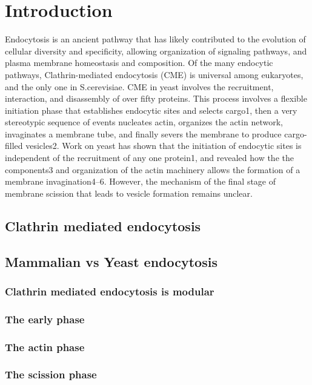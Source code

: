 \chapter{Introduction} %

\label{Ch:Aims} %

Endocytosis is an ancient pathway that has likely contributed to the evolution of cellular diversity and specificity, allowing organization of signaling pathways, and plasma membrane homeostasis and composition. Of the many endocytic pathways, Clathrin-mediated endocytosis (CME) is universal among eukaryotes, and the only one in S.cerevisiae. CME in yeast involves the recruitment, interaction, and disassembly of over fifty proteins. This process involves a flexible initiation phase that establishes endocytic sites and selects cargo1, then a very stereotypic sequence of events nucleates actin, organizes the actin network, invaginates a membrane tube, and finally severs the membrane to produce cargo-filled vesicles2. Work on yeast has shown that the initiation of endocytic sites is independent of the recruitment of any one protein1, and revealed how the the components3 and organization of the actin machinery allows the formation of a membrane invagination4–6. However, the mechanism of the final stage of membrane scission that leads to vesicle formation remains unclear.


	\section{Clathrin mediated endocytosis}
	
	\section{Mammalian vs Yeast endocytosis}
		\subsection{Clathrin mediated endocytosis is modular}
		\subsection{The early phase}
		\subsection{The actin phase}
		\subsection{The scission phase}
		
